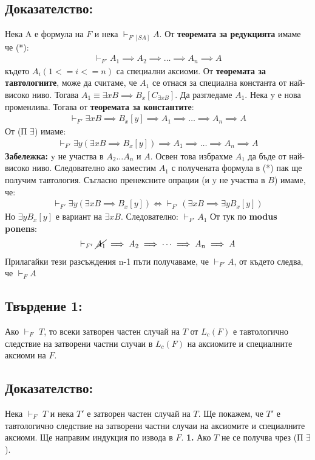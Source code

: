 \documentclass[french]{article}
\begin{document}
\subsection*{Доказателство:}
Нека A е формула на $F$ и нека $\vdash_{F'[SA]} A$. От \textbf{теоремата за редукцията} имаме че (*):
\begin{align*}
\vdash_{F'} A_1 \implies A_2 \implies \dots \implies A_n \implies A
\end{align*}
където $A_i (1<= i <= n)$ са специални аксиоми. От \textbf{теоремата за тавтологиите}, може да считаме, че $A_1$ се отнася за специална константа от най-високо ниво. Тогава $A_1 \equiv \exists x B \implies B_x[C_ {\exists x B}]$. Да разгледаме $A_1$. Нека y е нова променлива. Тогава от \textbf{теоремата за константите}:
\begin{align*}
\vdash_{F'} \exists x B \implies B_x[y] \implies A_1 \implies \dots \implies A_n \implies A
\end{align*}
От (П $\exists$) имаме: 
\begin{align*}
\vdash_{F'} \exists y(\exists x B \implies B_x[y]) \implies A_1 \implies \dots \implies A_n \implies A
\end{align*}
\textbf{Забележка:} y не участва в $A_2 \dots A_n$ и $A$. Освен това избрахме $A_1$ да бъде от най-високо ниво. Следователно ако заместим $A_1$ с получената формула в (*) пак ще получим тавтология. \newline
Съгласно пренексните опрации (и y не участва в $B$) имаме, че:
\begin{align*}
\vdash_{F'} \exists y(\exists x B \implies B_x[y]) \iff \vdash_{F'} (\exists x B \implies \exists y B_x[y]) 
\end{align*}
Но $ \exists y B_x[y]$ е вариант на $\exists x B$. Следователно: $\vdash_{F'} A_1$ От тук по \textbf{modus ponens}:
\begin{align*}
\vdash_{F'} \cancel{A_1} \implies A_2 \implies \dots \implies A_n \implies A
\end{align*}
Прилагайки тези разсъждения n-1 пъти получаваме, че $\vdash_{F'} A$, от където следва, че $\vdash_{F} A$

\subsection*{Твърдение 1:} Ако $\vdash_F$ $T$, то всеки затворен частен случай на $T$ от $L_c(F)$ е тавтологично следствие на затворени частни случаи в $L_c(F)$ на аксиомите и специалните аксиоми на $F$. 
\subsection*{Доказателство:} 
Нека $\vdash_F$ $T$ и нека $T'$ е затворен частен случай на $T$. \newline Ще покажем, че $T'$ е тавтологично следствие на затворени частни случаи на аксиомите и специалните аксиоми. Ще направим индукция по извода в $F$.
\newline\newline
\textbf{1.} Ако $T$ не се получва чрез (П $\exists$).
\end{document}
